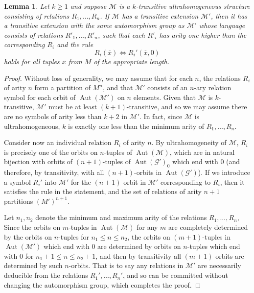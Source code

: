 \documentclass{amsart}
\newtheorem{lemma}[theorem]{Lemma}
\def\graph{\mathcal{G}}
\newcommand{\model}{\mathcal{M}}
\DeclareMathOperator{\Aut}{Aut}
\begin{document}
\begin{lemma}\label{arity growth lemma}
    Let $k \geq 1$ and suppose $\mathcal{M}$ is a $k$-transitive ultrahomogeneous structure consisting of relations $R_1, \dots, R_n$. If $\model$ has a transitive extension $\model'$, then it has a transitive extension with the same automorphism group as $\model'$ whose language consists of relations $R'_1, \dots, R'_n$, such that each $R'_i$ has arity one higher than the corresponding $R_i$ and the rule
    $$R_i(\overline{x}) \Longleftrightarrow R_i'(\overline{x}, 0)$$
    holds for all tuples $\overline{x}$ from $M$ of the appropriate length.
\end{lemma}
\begin{proof}
    Without loss of generality, we may assume that for each $n$, the relations $R_i$ of arity $n$ form a partition of $M^n$, and that $\model'$ consists of an $n$-ary relation symbol for each orbit of $\Aut(\model')$ on $n$ elements. Given that $\model$ is $k$-transitive, $\model'$ must be at least $(k+1)$-transitive, and so we may assume there are no symbols of arity less than $k+2$ in $\model'$. In fact, since $\model$ is ultrahomogeneous, $k$ is exactly one less than the minimum arity of $R_1, \dots, R_n$.

    Consider now an individual relation $R_i$ of arity $n$. By ultrahomogeneity of $\model$, $R_i$ is precisely one of the orbits on $n$-tuples of $\Aut(\model)$, which are in natural bijection with orbits of $(n+1)$-tuples of $\Aut(\graph')_0$ which end with 0 (and therefore, by transitivity, with all $(n+1)$-orbits in $\Aut(\graph')$). If we introduce a symbol $R_i'$ into $\model'$ for the $(n+1)$-orbit in $\model'$ corresponding to $R_i$, then it satisfies the rule in the statement, and the set of relations of arity $n+1$ partitions $(M')^{n+1}$.

    Let $n_{1}, n_2$ denote the minimum and maximum arity of the relations $R_1, \dots, R_n$, Since the orbits on $m$-tuples in $\Aut(\model)$ for any $m$ are completely determined by the orbits on $n$-tuples for $n_1 \leq n \leq n_2$, the orbits on $(m+1)$-tuples in $\Aut(\model')$ which end with 0 are determined by orbits on $n$-tuples which end with 0 for $n_1 +1 \leq n \leq n_2+1$, and then by transitivity all $(m+1)$-orbits are determined by such $n$-orbits. That is to say any relations in $\model'$ are necessarily deducible from the relations $R_1', \dots, R_n'$, and so can be committed without changing the automorphism group, which completes the proof.
\end{proof}
\end{document}

